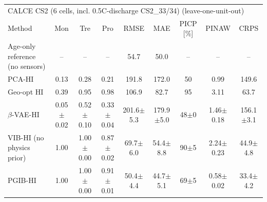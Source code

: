 \begin{tabular}{l c c c c c c c c}
\hline
\multicolumn{9}{l}{CALCE CS2 (6 cells, incl. 0.5C-discharge CS2\_33/34) (leave-one-unit-out)}\\
 Method & Mon & Tre & Pro & RMSE & MAE & PICP [\%] & PINAW & CRPS \\
\hline
Age-only reference (no sensors) & -- & -- & -- & 54.7 & 50.0 & -- & -- & -- \\
PCA-HI & 0.13 & 0.28 & 0.21 & 191.8 & 172.0 & 50 & 0.99 & 149.6 \\
Geo-opt HI & 0.39 & 0.95 & 0.98 & 106.9 & 82.7 & 95 & 3.11 & 63.7 \\
$\beta$-VAE-HI & 0.05$\pm$0.02 & 0.52$\pm$0.10 & 0.33$\pm$0.04 & 201.6$\pm$5.3 & 179.9$\pm$5.0 & 48$\pm$0 & 1.46$\pm$0.18 & 156.1$\pm$3.1 \\
VIB-HI (no physics prior) & 1.00 & 1.00$\pm$0.00 & 0.87$\pm$0.02 & 69.7$\pm$6.0 & 54.4$\pm$8.8 & 90$\pm$5 & 2.24$\pm$0.23 & 44.9$\pm$4.8 \\
PGIB-HI & 1.00 & 1.00$\pm$0.00 & 0.91$\pm$0.01 & 50.4$\pm$4.4 & 44.7$\pm$5.1 & 69$\pm$5 & 0.58$\pm$0.02 & 33.4$\pm$4.2 \\
\hline
\end{tabular}
